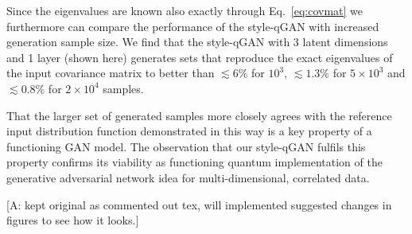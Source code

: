 \documentclass[twocolumn,preprintnumbers,superscriptaddress]{revtex4-2}
\newcommand{\commentAF}[1]{{\color{cyan} {[A: #1]}}}
\begin{document}
Since the eigenvalues are known also exactly through Eq.~\ref{eq:covmat} we furthermore can compare the performance of the style-qGAN with increased generation sample size. We find that the style-qGAN with 3 latent dimensions and 1 layer (shown here)
generates sets that reproduce the exact eigenvalues of the input covariance matrix to better than $\lesssim 6\%$ for $10^3$, $\lesssim 1.3\%$ for $5\times10^3$ and $\lesssim 0.8\%$ for $2\times10^4$ samples.

That the larger set of generated samples more closely agrees with the reference input distribution function demonstrated in this way is a key property of a functioning GAN model. The observation that our style-qGAN fulfils this property confirms its viability as functioning quantum implementation of the generative adversarial network idea for multi-dimensional, correlated data.



\commentAF{kept original as commented out tex, will implemented suggested changes in figures to see how it looks.}
\end{document}

